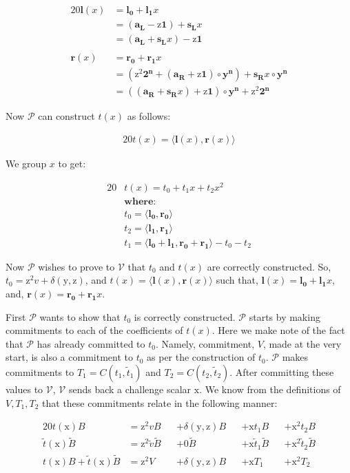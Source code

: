 \documentclass{article}
\newcommand{\eq}[1]{\begin{alignat*}{20}#1\end{alignat*}}
\renewcommand{\vec}[1]{\boldsymbol{#1}}
\newcommand{\ran}[1]{\mathrm{#1}}
\newcommand{\vecran}[1]{\mathbf{#1}}
\newcommand{\V}{\mathcal{V}}
\renewcommand{\P}{\mathcal{P}}
\newcommand{\dotp}[2]{\langle #1, #2 \rangle}
\newcommand{\opn}[1]{\operatorname{#1}}
\newcommand{\vecl}[1]{\vec{#1_{\opn{L}}}}
\newcommand{\vecr}[1]{\vec{#1_{\opn{R}}}}
\newcommand{\blind}[1]{\widetilde{#1}}
\newcommand{\bt}{\blind{t}}
\newcommand{\bv}{\blind{v}}
\newcommand{\bB}{\blind{B}}
\begin{document}
\eq{
	\vec{l}(x) &= \vec{l_0} + \vec{l_1}x \\ 
	&= (\vecl{a} - \ran{z}\vec{1}) + \vecl{s}x \\ 
	&= (\vecl{a} + \vecl{s}x) - \ran{z}\vec{1}\\&\\
	\vec{r}(x) &= \vec{r_0} + \vec{r_1}x \\ 
	&= (\ran{z^2}\vec{2^n} + (\vecr{a} + \ran{z}\vec{1})\circ\vecran{y}^{\vec{n}}) + \vecr{s}x\circ\vecran{y}^{\vec{n}} \\ 
	&= ((\vecr{a} + \vecr{s}x) + \ran{z}\vec{1}) \circ \vecran{y}^{\vec{n}} + \ran{z}^2\vec{2^n}
}

Now $\P$ can construct $t(x)$ as follows:

\eq{
	t(x) = \dotp{\vec{l}(x)}{\vec{r}(x)}
}

We group $x$ to get:

\eq{
	&t(x) = t_0 + t_1x + t_2x^2 \\
	&\textbf{where:} \\
	&t_0 = \dotp{\vec{l_0}}{\vec{r_0}}\\
	&t_2 = \dotp{\vec{l_1}}{\vec{r_1}}\\
	&t_1 = \dotp{\vec{l_0}+\vec{l_1}}{\vec{r_0} + \vec{r_1}} - t_0 - t_2
}

Now $\P$ wishes to prove to $\V$ that $t_0$ and $t(x)$ are correctly
constructed. So, $t_0 = \ran{z^2}v + \delta(\ran{y},\ran{z})$, and $t(x)
= \dotp{\vec{l}(x)}{\vec{r}(x)}$ such that, $\vec{l}(x) = \vec{l_0}
+ \vec{l_1}x$, and, $\vec{r}(x) = \vec{r_0} + \vec{r_1}x$.

First $\P$ wants to show that $t_0$ is correctly constructed. $\P$
starts by making commitments to each of the coefficients of $t(x)$. Here
we make note of the fact that $\P$ has already committed to $t_0$. Namely,
commitment, $V$, made at the very start, is also a commitment to $t_0$
as per the construction of $t_0$. $\P$ makes commitments to $T_1 =
C(t_1, \bt_1)$ and $T_2 = C(t_2, \bt_2)$. After committing these values
to $\V$, $\V$ sends back a challenge scalar $\ran{x}$. We know from
the definitions of $V, T_1, T_2$ that these commitments relate in the
following manner:

\eq{
	t(\ran{x})B                   &= \ran{z^2}vB      &&+ \delta(\ran{y},\ran{z})B &&+ \ran{x}t_1B       &&+ \ran{x^2}t_2B \\
	\bt(\ran{x})\bB               &= \ran{z^2}\bv \bB &&+ 0\bB                     &&+ \ran{x} \bt_1 \bB &&+ \ran{x^2} \bt_2 \bB\\
	t(\ran{x})B + \bt(\ran{x})\bB &= \ran{z^2}V       &&+ \delta(\ran{y},\ran{z})B &&+ \ran{x}T_1        &&+ \ran{x^2}T_2
}
\end{document}
